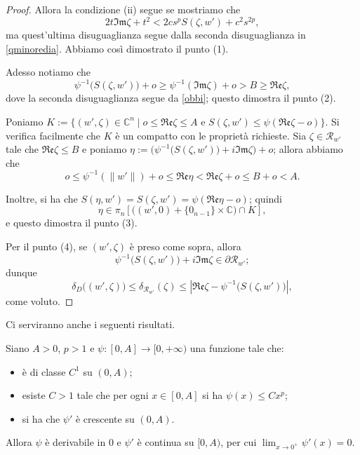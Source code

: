 \begin{proof}
    Allora la condizione (ii) segue se mostriamo che
    $$2t\mathfrak{Im}\zeta+t^2<2cs^pS(\zeta,w')+c^2s^{2p},$$
    ma quest'ultima disuguaglianza segue dalla seconda disuguaglianza in \eqref{qminoredia}. Abbiamo così dimostrato il punto (1).

    Adesso notiamo che
    $$\psi^{-1}\big(S(\zeta,w')\big)+o \ge \psi^{-1}(\mathfrak{Im}\zeta)+o>B\ge\mathfrak{Re}\zeta,$$
    dove la seconda disuguaglianza segue da \eqref{obbi}; questo dimostra il punto (2).

    Poniamo $K:=\{(w',\zeta)\in\mathbb{C}^n\mid o\le\mathfrak{Re}\zeta\le A\text{ e }S(\zeta,w')\le\psi(\mathfrak{Re}\zeta-o)\}$. Si verifica facilmente che $K$ è un compatto con le proprietà richieste. Sia $\zeta\in\mathcal{R}_{w'}$ tale che $\mathfrak{Re}\zeta\le B$ e poniamo $\eta:=\Big(\psi^{-1}\big(S(\zeta,w')\big)+i\mathfrak{Im}\zeta\Big)+o$; allora abbiamo che
    $$o\le\psi^{-1}(\|w'\|)+o\le\mathfrak{Re}\eta<\mathfrak{Re}\zeta+o\le B+o<A.$$

    Inoltre, si ha che $S(\eta,w')=S(\zeta,w')=\psi(\mathfrak{Re}\eta-o)$; quindi
    $$\eta\in\pi_n\left[\big((w',0)+\{0_{n-1}\}\times\mathbb{C}\big)\cap K\right],$$
    e questo dimostra il punto (3).

    Per il punto (4), se $(w',\zeta)$ è preso come sopra, allora
    $$\psi^{-1}\big(S(\zeta,w')\big)+i\mathfrak{Im}\zeta\in\partial\mathcal{R}_{w'};$$
    dunque
    $$\delta_D\big((w',\zeta)\big)\le \delta_{\mathcal{R}_{w'}}(\zeta)\le\left|\mathfrak{Re}\zeta-\psi^{-1}\big(S(\zeta,w')\big)\right|,$$
    come voluto.
\end{proof}

Ci serviranno anche i seguenti risultati.

\begin{lm} \label{analisibase}
    Siano $A>0$, $p>1$ e $\psi:[0,A]\longrightarrow[0,+\infty)$ una funzione tale che:
    \begin{itemize}
        \item è di classe $C^1$ su $(0,A)$;
        \item esiste $C>1$ tale che per ogni $x\in[0,A]$ si ha $\psi(x) \le Cx^{p}$;
        \item si ha che $\psi'$ è crescente su $(0,A)$.
    \end{itemize}

    Allora $\psi$ è derivabile in $0$ e $\psi'$ è continua su $[0,A)$, per cui $\displaystyle\lim_{x\longrightarrow0^+}\psi'(x)=0$.
\end{lm}

